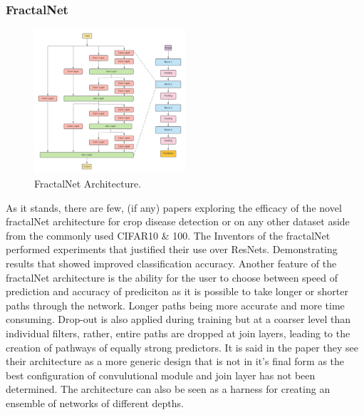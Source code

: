   \subsubsection{FractalNet}
    \begin{figure}
      \centering
      \includegraphics[width=0.5\textwidth]{Images/FractalNetArchitectureCopy}
      \caption{\label{fig:FractalNet_arcitepcture}FractalNet Architecture.}
    \end{figure}
    As it stands, there are few, (if any) papers exploring the efficacy of the novel fractalNet architecture \citep{Larsson2016} for crop disease detection or on any other dataset aside from the commonly used CIFAR10 \& 100.
    The Inventors of the fractalNet performed experiments that justified their use over ResNets. Demonstrating results that showed improved classification accuracy. Another feature of the fractalNet architecture is the ability for the user to choose between speed of prediction and accuracy of prediciton as it is possible to take longer or shorter paths through the network. Longer paths being more accurate and more time consuming. Drop-out is also applied during training but at a coarser level than individual filters, rather, entire paths are dropped at join layers, leading to the creation of pathways of equally strong predictors.
    It is said in the paper they see their architecture as a more generic design that is not in it's final form as the best configuration of convulutional module and join layer has not been determined. The architecture can also be seen as a harness for creating an ensemble of networks of different depths.
